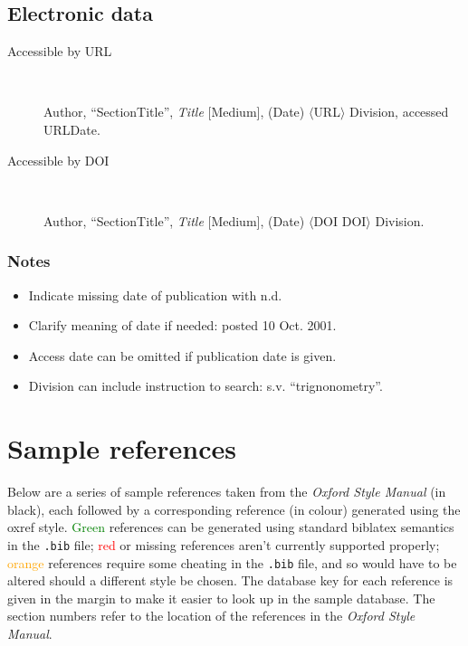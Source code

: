 \documentclass[extrafontsizes,11pt,a4paper,oneside]{memoir}
\newcommand*{\lit}[1]{\textsf{#1}}
\begin{document}
    \section{Electronic data}\label{sec:electronic}
    
    \begin{description}
        \item[Accessible by URL]~
        \par Author, \enquote{SectionTitle}, \emph{Title} [Medium], (Date) $\langle$URL$\rangle$ Division, \lit{accessed} URLDate.
        \\
        \item[Accessible by DOI]~
        \par Author, \enquote{SectionTitle}, \emph{Title} [Medium], (Date) $\langle$\lit{DOI} DOI$\rangle$ Division.
    \end{description}
    
    \subsection{Notes}
    \begin{itemize}
        \item Indicate missing date of publication with n.d.
        \item Clarify meaning of date if needed: posted 10 Oct. 2001.
        \\
        \item Access date can be omitted if publication date is given.
        \item Division can include instruction to search: s.v. \enquote{trignonometry}.
    \end{itemize}
    
    \chapter{Sample references}
    \setlength{\parindent}{0pt}\nonzeroparskip
    
    Below are a series of sample references taken from the \emph{Oxford Style Manual} (in black), each followed by a corresponding reference (in colour) generated using the \textsf{oxref} style. \textcolor{Green}{Green} references can be generated using standard \textsf{biblatex} semantics in the \texttt{.bib} file; \textcolor{red}{red} or missing references aren't currently supported properly; \textcolor{orange}{orange} references require some cheating in the \texttt{.bib} file, and so would have to be altered should a different style be chosen. The database key for each reference is given in the margin to make it easier to look up in the sample database. The section numbers refer to the location of the references in the \emph{Oxford Style Manual}.
    
\end{document}

